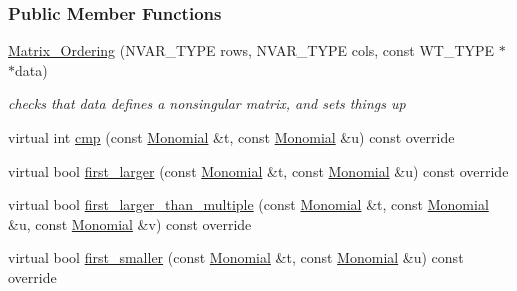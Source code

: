 \subsubsection*{Public Member Functions}
\begin{DoxyCompactItemize}
\item 
\hyperlink{group__orderinggroup_a59c24eeefe79a784f51253dcd0a51101}{Matrix\+\_\+\+Ordering} (N\+V\+A\+R\+\_\+\+T\+Y\+PE rows, N\+V\+A\+R\+\_\+\+T\+Y\+PE cols, const W\+T\+\_\+\+T\+Y\+PE $\ast$$\ast$data)
\begin{DoxyCompactList}\small\item\em checks that {\ttfamily data} defines a nonsingular matrix, and sets things up \end{DoxyCompactList}\item 
virtual int \hyperlink{group__orderinggroup_a36f19a053b608126d1e35e62e6c35e35}{cmp} (const \hyperlink{group__polygroup_class_monomial}{Monomial} \&t, const \hyperlink{group__polygroup_class_monomial}{Monomial} \&u) const override
\item 
virtual bool \hyperlink{group__orderinggroup_aed327b2dfb248ac239694717c3313e31}{first\+\_\+larger} (const \hyperlink{group__polygroup_class_monomial}{Monomial} \&t, const \hyperlink{group__polygroup_class_monomial}{Monomial} \&u) const override
\item 
virtual bool \hyperlink{group__orderinggroup_ad9be3dafe786d480521cc0a31ebdef8c}{first\+\_\+larger\+\_\+than\+\_\+multiple} (const \hyperlink{group__polygroup_class_monomial}{Monomial} \&t, const \hyperlink{group__polygroup_class_monomial}{Monomial} \&u, const \hyperlink{group__polygroup_class_monomial}{Monomial} \&v) const override
\item 
virtual bool \hyperlink{group__orderinggroup_ab7881ff6bbc52d02bf786ef8ab8c5c37}{first\+\_\+smaller} (const \hyperlink{group__polygroup_class_monomial}{Monomial} \&t, const \hyperlink{group__polygroup_class_monomial}{Monomial} \&u) const override
\end{DoxyCompactItemize}

